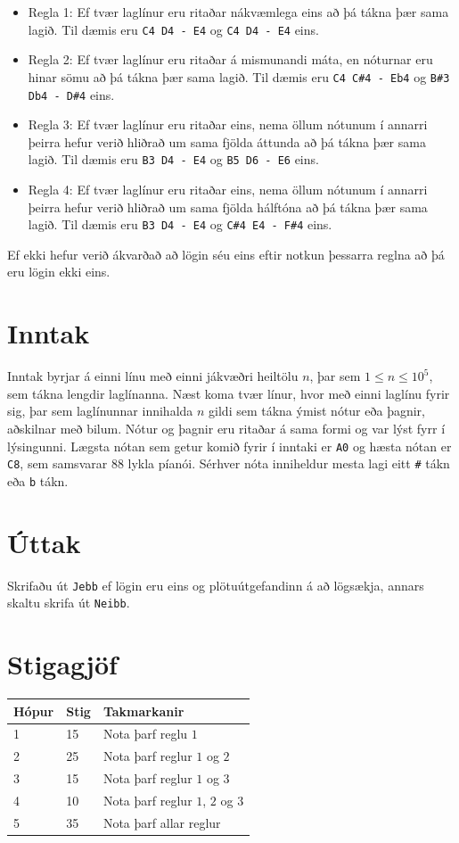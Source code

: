 \begin{itemize}
  \item Regla 1: Ef tvær laglínur eru ritaðar nákvæmlega eins að þá tákna þær sama lagið.
  Til dæmis eru \texttt{C4 D4 - E4} og \texttt{C4 D4 - E4} eins.
  \item Regla 2: Ef tvær laglínur eru ritaðar á mismunandi máta, en nóturnar eru hinar sömu að þá tákna þær sama lagið.
  Til dæmis eru \texttt{C4 C\#4 - Eb4} og \texttt{B\#3 Db4 - D\#4} eins.
  \item Regla 3: Ef tvær laglínur eru ritaðar eins, nema öllum nótunum í annarri þeirra hefur verið hliðrað um sama fjölda áttunda að þá tákna þær sama lagið.
  Til dæmis eru \texttt{B3 D4 - E4} og \texttt{B5 D6 - E6} eins.
  \item Regla 4: Ef tvær laglínur eru ritaðar eins, nema öllum nótunum í annarri þeirra hefur verið hliðrað um sama fjölda hálftóna að þá tákna þær sama lagið.
  Til dæmis eru \texttt{B3 D4 - E4} og \texttt{C\#4 E4 - F\#4} eins.
\end{itemize}

Ef ekki hefur verið ákvarðað að lögin séu eins eftir notkun þessarra reglna að þá eru lögin ekki eins.

\section*{Inntak}
Inntak byrjar á einni línu með einni jákvæðri heiltölu $n$, þar sem $1 \leq n \leq 10^5$, sem tákna lengdir laglínanna.
Næst koma tvær línur, hvor með einni laglínu fyrir sig, þar sem laglínunnar innihalda $n$ gildi sem tákna ýmist nótur eða þagnir, aðskilnar með bilum.
Nótur og þagnir eru ritaðar á sama formi og var lýst fyrr í lýsingunni.
Lægsta nótan sem getur komið fyrir í inntaki er \texttt{A0} og hæsta nótan er \texttt{C8}, sem samsvarar $88$ lykla píanói.
Sérhver nóta inniheldur mesta lagi eitt \texttt{\#} tákn eða \texttt{b} tákn.


\section*{Úttak}
Skrifaðu út \texttt{Jebb} ef lögin eru eins og plötuútgefandinn á að lögsækja, annars skaltu skrifa út \texttt{Neibb}.

\section*{Stigagjöf}
\begin{tabular}{|l|l|l|}
\hline
Hópur & Stig & Takmarkanir \\ \hline
1     & 15   & Nota þarf reglu $1$ \\ \hline
2     & 25   & Nota þarf reglur $1$ og $2$ \\ \hline
3     & 15   & Nota þarf reglur $1$ og $3$ \\ \hline
4     & 10   & Nota þarf reglur $1$, $2$ og $3$ \\ \hline
5     & 35   & Nota þarf allar reglur \\ \hline
\end{tabular}

